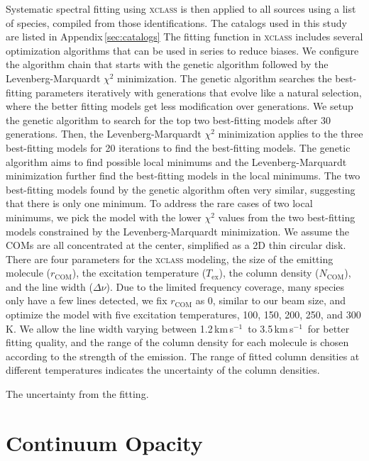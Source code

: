 \documentclass[twocolumn]{aastex62}
\newcommand{\kms}{\mbox{\,km\,s$^{-1}$}}
\begin{document}
Systematic spectral fitting using \textsc{xclass} is then applied to all sources using a list of species, compiled from those identifications.  The catalogs used in this study are listed in Appendix\,\ref{sec:catalogs}  The fitting function in \textsc{xclass} includes several optimization algorithms that can be used in series to reduce biases.  We configure the algorithm chain that starts with the genetic algorithm followed by the Levenberg-Marquardt $\chi^{2}$ minimization.  The genetic algorithm searches the best-fitting parameters iteratively with generations that evolve like a natural selection, where the better fitting models get less modification over generations.  We setup the genetic algorithm to search for the top two best-fitting models after 30 generations.  Then, the Levenberg-Marquardt $\chi^{2}$ minimization applies to the three best-fitting models for 20 iterations to find the best-fitting models.  The genetic algorithm aims to find possible local minimums and the Levenberg-Marquardt minimization further find the best-fitting models in the local minimums.  The two best-fitting models found by the genetic algorithm often very similar, suggesting that there is only one minimum.  To address the rare cases of two local minimums, we pick the model with the lower $\chi^{2}$ values from the two best-fitting models constrained by the Levenberg-Marquardt minimization.  We assume the COMs are all concentrated at the center, simplified as a 2D thin circular disk.  There are four parameters for the \textsc{xclass} modeling, the size of the emitting molecule ($r_\text{COM}$), the excitation temperature ($T_\text{ex}$), the column density ($N_\text{COM}$), and the line width ($\Delta \nu$).  Due to the limited frequency coverage, many species only have a few lines detected, we fix $r_\text{COM}$ as 0, similar to our beam size, and optimize the model with five excitation temperatures, 100, 150, 200, 250, and 300 K.  We allow the line width varying between 1.2\kms\ to 3.5\kms\ for better fitting quality, and the range of the column density for each molecule is chosen according to the strength of the emission.  The range of fitted column densities at different temperatures indicates the uncertainty of the column densities.

The uncertainty from the fitting.

\newpage


\section{Continuum Opacity}
\end{document}
